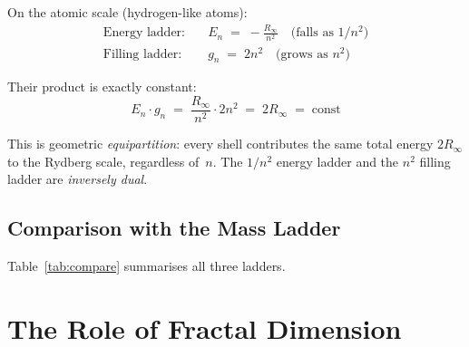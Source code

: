 On the atomic scale (hydrogen-like atoms):
\begin{align}
  \text{Energy ladder:}  &\quad E_n \;=\; -\frac{R_\infty}{n^2}
    \quad\text{(falls as } 1/n^2\text{)} \\
  \text{Filling ladder:} &\quad g_n \;=\; 2n^2
    \quad\text{(grows as } n^2\text{)}
\end{align}

Their product is exactly constant:
\begin{equation}
  \boxed{E_n \cdot g_n \;=\; \frac{R_\infty}{n^2} \cdot 2n^2 \;=\; 2R_\infty
  \;=\; \text{const}}
  \label{eq:duality}
\end{equation}

This is geometric \emph{equipartition}: every shell contributes the same total
energy $2R_\infty$ to the Rydberg scale, regardless of~$n$.
The $1/n^2$ energy ladder and the $n^2$ filling ladder are \emph{inversely dual}.

\subsection{Comparison with the Mass Ladder}

Table~\ref{tab:compare} summarises all three ladders.

\begin{table}[htbp]
\centering
\caption{Three ladders — one geometric origin}
\label{tab:compare}
\end{table}

\section{The Role of Fractal Dimension}
\label{sec:fractal}

